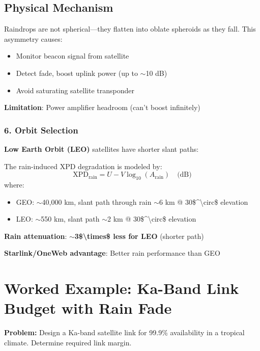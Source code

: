 \subsection{Physical Mechanism}

Raindrops are not spherical---they flatten into oblate spheroids as they fall. This asymmetry causes:
\begin{itemize}
\tightlist
\item
  Monitor beacon signal from satellite
\item
  Detect fade, boost uplink power (up to $\sim$10 dB)
\item
  Avoid saturating satellite transponder
\end{itemize}

\textbf{Limitation}: Power amplifier headroom (can't boost infinitely)



\subsubsection{6. Orbit Selection}

\textbf{Low Earth Orbit (LEO)} satellites have shorter slant paths:

The rain-induced XPD degradation is modeled by:
\begin{equation}
\text{XPD}_{\text{rain}} = U - V \log_{10}(A_{\text{rain}}) \quad \text{(dB)}
\label{eq:xpd-rain}
\end{equation}
where:
\begin{itemize}
\tightlist
\item
  GEO: $\sim$40,000 km, slant path through rain
  $\sim$6 km @ 30\$\^{}\textbackslash circ\$ elevation
\item
  LEO: $\sim$550 km, slant path $\sim$2 km @
  30\$\^{}\textbackslash circ\$ elevation
\end{itemize}

\textbf{Rain attenuation}:
\textbf{$\sim$3\$\textbackslash times\$ less for LEO} (shorter
path)

\textbf{Starlink/OneWeb advantage}: Better rain performance than GEO

\section{Worked Example: Ka-Band Link Budget with Rain Fade}

\textbf{Problem:} Design a Ka-band satellite link for 99.9\% availability in a tropical climate. Determine required link margin.

